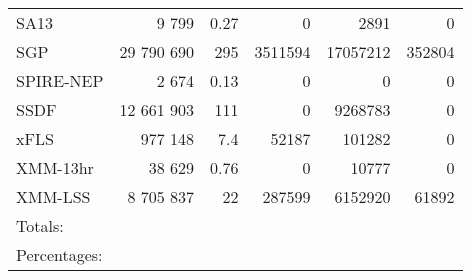 \begin{table*}
\begin{tabular}{l rrrrr}
SA13                 &      9 799 & 0.27             & 0         & 2891      & 0       \\
SGP                  & 29 790 690 & 295              & 3511594   & 17057212  & 352804  \\
SPIRE-NEP            &      2 674 & 0.13             & 0         & 0         & 0       \\
SSDF                 & 12 661 903 & 111              & 0         & 9268783   & 0       \\
xFLS                 &    977 148 & 7.4              & 52187     & 101282    & 0       \\
XMM-13hr             &     38 629 & 0.76             & 0         & 10777     & 0       \\
XMM-LSS              &  8 705 837 & 22               & 287599    & 6152920   & 61892   \\
\hline
Totals:\\
Percentages:
\hline


\end{tabular}
\end{table*}